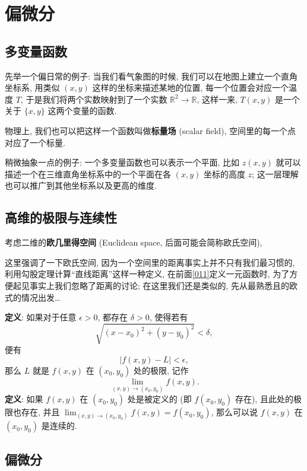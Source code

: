 \section{偏微分}\label{023}

\subsection{多变量函数}

先举一个偏日常的例子: 当我们看气象图的时候,
我们可以在地图上建立一个直角坐标系, 用类似 \((x,y)\)
这样的坐标来描述某地的位置, 每一个位置会对应一个温度 \(T\),
于是我们将两个实数映射到了一个实数
\(\mathbb{R}^2\rightarrow\mathbb{R}\), 这样一来, \(T(x,y)\) 是一个关于
\(\{x,y\}\) 这两个变量的函数.

\begin{newquote}
物理上, 我们也可以把这样一个函数叫做\textbf{标量场} (scalar field),
空间里的每一个点对应了一个标量.
\end{newquote}

稍微抽象一点的例子: 一个多变量函数也可以表示一个平面, 比如 \(z(x,y)\)
就可以描述一个在三维直角坐标系中的一个平面在各 \((x,y)\) 坐标的高度
\(z\); 这一层理解也可以推广到其他坐标系以及更高的维度.

\subsection{高维的极限与连续性}

考虑二维的\textbf{欧几里得空间} (Euclidean space,
后面可能会简称欧氏空间),

\begin{newquote}
这里强调了一下欧氏空间, 因为一个空间里的距离事实上并不只有我们最习惯的,
利用勾股定理计算``直线距离''这样一种定义, 在前面\ref{011}定义一元函数时,
为了方便起见事实上我们忽略了距离的讨论; 在这里我们还是类似的,
先从最熟悉且的欧式的情况出发\ldots{}
\end{newquote}

\textbf{定义}: 如果对于任意 \(\epsilon>0\), 都存在 \(\delta>0\),
使得若有 \[
\sqrt{(x-x_0)^2+(y-y_0)^2}<\delta,
\] 便有 \[
|f(x,y)-L|<\epsilon,
\] 那么 \(L\) 就是 \(f(x,y)\) 在 \((x_0,y_0)\) 处的极限, 记作 \[
\lim_{(x,y)\rightarrow(x_0,y_0)}f(x,y).
\] \textbf{定义}: 如果 \(f(x,y)\) 在 \((x_0,y_0)\) 处是被定义的 (即
\(f(x_0,y_0)\) 存在), 且此处的极限也存在, 并且
\(\lim_{(x,y)\rightarrow(x_0,y_0)}f(x,y)=f(x_0,y_0)\), 那么可以说
\(f(x,y)\) 在 \((x_0,y_0)\) 是连续的.

\subsection{偏微分}

